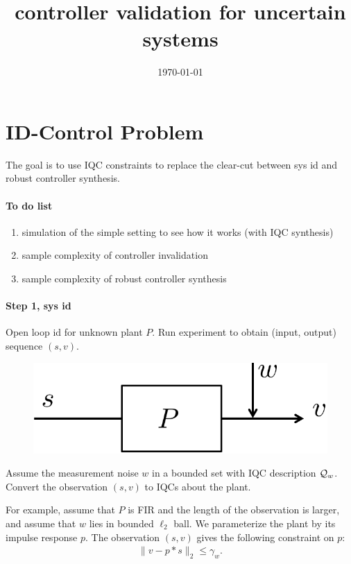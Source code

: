 \documentclass[11pt, onecolumn]{article}
\begin{document}
\title{controller validation for uncertain systems}
\date{\today}



\setcounter{page}{1}


\section{ID-Control Problem}
The goal is to use IQC constraints to replace the clear-cut between sys id and robust controller
synthesis.


\paragraph{To do list }
\begin{enumerate}
\item
  simulation of the simple setting to see how it works (with IQC synthesis)
\item
  sample complexity of controller invalidation
\item
  sample complexity of robust controller synthesis
\end{enumerate}



\paragraph{Step 1, sys id}
Open loop id for unknown plant $P$. Run experiment to obtain (input, output) sequence
$(s,v)$.
\begin{figure}[!ht]
  \centering
  \includegraphics[width=.3\linewidth]{sys3.pdf}
\end{figure}

Assume the measurement noise $w$ in a bounded set with IQC description $\mathcal Q_w$. Convert the
observation $(s,v)$ to IQCs about the plant.

For example, assume that $P$ is FIR and the length of the observation is larger, and assume that $w$
lies in bounded $\ell_2$ ball. We parameterize the plant by its impulse response $p$.  The observation
$(s,v)$ gives the following constraint on $p$:
\begin{align*}
  \| v - p*s\|_2\le \gamma_w.
\end{align*}
\end{document}
